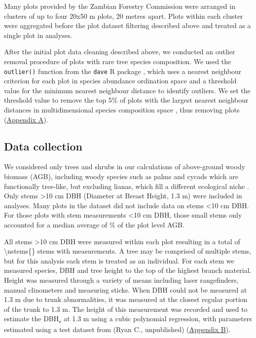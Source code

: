 \documentclass[11pt,a4paper]{article}
\begin{document}
Many plots provided by the Zambian Forestry Commission were arranged in clusters of up to four 20x50 m plots, 20 metres apart. Plots within each cluster were aggregated before the plot dataset filtering described above and treated as a single plot in analyses.

After the initial plot data cleaning described above, we conducted an outlier removal procedure of plots with rare tree species composition. We used the \verb|outlier()| function from the \verb|dave| R package \citep{dave}, which uses a nearest neighbour criterion for each plot in species abundance ordination space and a threshold value for the minimum nearest neighbour distance to identify outliers. We set the threshold value to remove the top 5\% of plots with the largest nearest neighbour distances in multidimensional species composition space \citep{Otto2013}, thus removing \noutliers{} plots (\hyperref[appendixa]{Appendix A}).

\subsection{Data collection}
 
We considered only trees and shrubs in our calculations of above-ground woody biomass (AGB), including woody species such as palms and cycads which are functionally tree-like, but excluding lianas, which fill a different ecological niche \citep{Selaya2008}. Only stems >10 cm DBH (Diameter at Breast Height, 1.3 m) were included in analyses. Many plots in the dataset did not include data on stems <10 cm DBH. For those plots with stem measurements <10 cm DBH, those small stems only accounted for a median average of \percsmallagb{}\% of the plot level AGB. 

All stems >10 cm DBH were measured within each plot resulting in a total of \num[group-separator={,}]{\nstems{}} stems with measurements. A tree may be comprised of multiple stems, but for this analysis each stem is treated as an individual. For each stem we measured species, DBH and tree height to the top of the highest branch material. Height was measured through a variety of means including laser rangefinders, manual clinometers and measuring sticks. When DBH could not be measured at 1.3 m due to trunk abnormalities, it was measured at the closest regular portion of the trunk to 1.3 m. The height of this measurement was recorded and used to estimate the DBH\textsubscript{e} at 1.3 m using a cubic polynomial regression, with parameters estimated using a test dataset from (Ryan C., unpublished) (\hyperref[appendixb]{Appendix B}).
\end{document}
